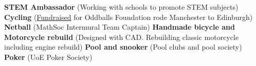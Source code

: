 \documentclass[a4paper,10pt]{letter}
\begin{document}


\textbf{STEM Ambassador} (Working with schools to promote STEM subjects)
\textbf{Cycling} (\href{https://www.justgiving.com/page/noahsammyoddballsfdncycle?utm_medium=fundraising&utm_content=page%2Fnoahsammyoddballsfdncycle&utm_source=sms&utm_campaign=pfp-sms}{Fundraised} for Oddballs Foundation rode Manchester to Edinburgh)
\textbf{Netball} (MathSoc Intermural Team Captain)
\textbf{Handmade bicycle and Motorcycle rebuild} (Designed with CAD. Rebuilding classic motorcycle including engine rebuild)
\textbf{Pool and snooker} (Pool clubs and pool society)
\textbf{Poker} (UoE Poker Society)




\end{document}
